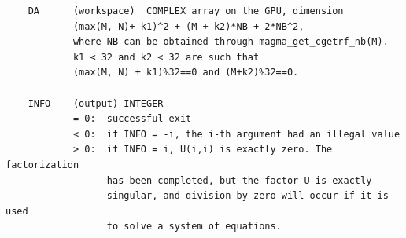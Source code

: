 \documentclass[10pt]{book}
\begin{document}
\begin{verbatim}
    DA      (workspace)  COMPLEX array on the GPU, dimension 
            (max(M, N)+ k1)^2 + (M + k2)*NB + 2*NB^2,
            where NB can be obtained through magma_get_cgetrf_nb(M).
            k1 < 32 and k2 < 32 are such that 
            (max(M, N) + k1)%32==0 and (M+k2)%32==0.

    INFO    (output) INTEGER   
            = 0:  successful exit   
            < 0:  if INFO = -i, the i-th argument had an illegal value   
            > 0:  if INFO = i, U(i,i) is exactly zero. The factorization   
                  has been completed, but the factor U is exactly   
                  singular, and division by zero will occur if it is used   
                  to solve a system of equations.   
\end{verbatim}

\newpage
\end{document}
